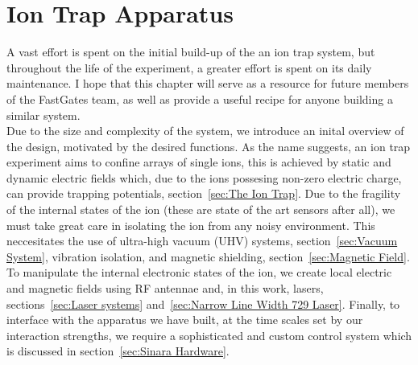 


\chapter{Ion Trap Apparatus}

    A vast effort is spent on the initial build-up of the an ion trap system, but
    throughout the life of the experiment, a greater effort is spent on its daily
    maintenance.  I hope that this chapter will serve as a resource for future
    members of the FastGates team, as well as provide a useful recipe for anyone
    building a similar system. \\

    Due to the size and complexity of the system, we introduce an inital overview of
    the design, motivated by the desired functions.  As the name suggests, an ion
    trap experiment aims to confine arrays of single ions, this is achieved by
    static and dynamic electric fields which, due to the ions possesing non-zero
    electric charge, can provide trapping potentials, section~\ref{sec:The Ion
    Trap}. Due to the fragility of the internal states of the ion (these are state
    of the art sensors after all), we must take great care in isolating the ion from
    any noisy environment. This neccesitates the use of ultra-high vacuum (UHV)
    systems, section~\ref{sec:Vacuum System}, vibration isolation, and magnetic
    shielding, section~\ref{sec:Magnetic Field}. To manipulate the internal electronic states of the ion, we create
    local electric and magnetic fields using RF antennae and, in this work, lasers,
    sections~\ref{sec:Laser systems} and~\ref{sec:Narrow Line Width 729 Laser}.
    Finally, to interface with the apparatus we have built, at the time scales set by our interaction strengths, we require a sophisticated and custom control system which is discussed in section~\ref{sec:Sinara Hardware}.

